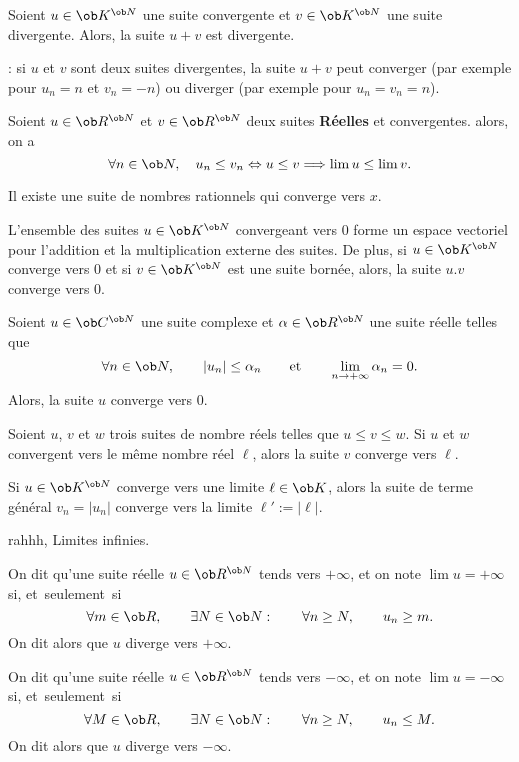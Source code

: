 \Propriete []  Soient $u\in\ob K^{\ob N}$ une suite convergente et $v\in\ob K^{\ob N}$ une suite divergente. Alors, la suite $u+v$ est divergente. 
\bigskip

\Remarque : si $u$ et $v$ sont deux suites divergentes, la suite $u+v$ peut converger (par exemple pour $u_n=n$ et $v_n=-n$) ou diverger (par exemple pour $u_n=v_n=n$). 
\bigskip


\Propriete [Title=Conservation des in\'egalit\'es larges par passage \`a la limite]
Soient $u\in\ob R^{\ob N}$ et $v\in\ob R^{\ob N}$ deux suites 
{\bf R\'eelles} et convergentes. alors, on a 
$$
\forall n\in\ob N, \quad u_n\le v_n\Leftrightarrow u\le v\Longrightarrow \lim u\le \lim v. 
$$ 


Il existe une suite de nombres rationnels qui converge vers $x$. 

\Propriete []  L'ensemble des suites $u\in\ob K^{\ob N}$ convergeant vers $0$ forme un espace vectoriel pour l'addition et la multiplication externe des suites. 
De plus, si $u\in\ob K^{\ob N}$ converge vers $0$ et si $v\in\ob K^{\ob N}$ est une suite born\'ee, alors, la suite $u.v$ converge vers $0$. 
\bigskip


\Propriete []  Soient $u\in\ob C^{\ob N}$ une suite complexe et $\alpha\in\ob R^{\ob N}$ une suite r\'eelle telles que 
$$
\forall n\in\ob N, \qquad |u_n|\le \alpha_n\qquad \mbox{et}\qquad \lim_{n\to+\infty}\alpha_n=0.
$$
Alors, la suite $u$ converge vers $0$. 
\bigskip


\Propriete [Title=Principe des gendarmes]
Soient $u$, $v$ et $w$ trois suites de nombre r\'eels telles que $u\le v\le w$. Si $u$ et $w$ convergent vers le m\^eme nombre r\'eel $\ell$, alors la suite $v$ converge vers $\ell$. 
\bigskip


\Propriete []  Si $u\in\ob K^{\ob N}$ converge vers une limite $\ell\in\ob K$, alors la suite de terme g\'en\'eral $v_n=|u_n|$ converge vers la limite $\ell':=|\ell|$. 
\bigskip

\Subsection rahhh, Limites infinies. 

\Definition []  On dit qu'une suite r\'eelle $u\in\ob R^{\ob N}$ tends vers $+\infty$, et on note $\lim u=+\infty$ si, et~seulement~si
$$
\forall m\in\ob R, \qquad \exists N\in\ob N:\qquad\forall n\ge N, \qquad u_n\ge m.
$$
On dit alors que $u$ diverge vers $+\infty$. 
\bigskip

\Definition []  On dit qu'une suite r\'eelle $u\in\ob R^{\ob N}$ tends vers $-\infty$, et on note $\lim u=-\infty$ si, et~seulement~si
$$
\forall M\in\ob R, \qquad \exists N\in\ob N:\qquad\forall n\ge N, \qquad u_n\le M.
$$
On dit alors que $u$ diverge vers $-\infty$. 
\bigskip



